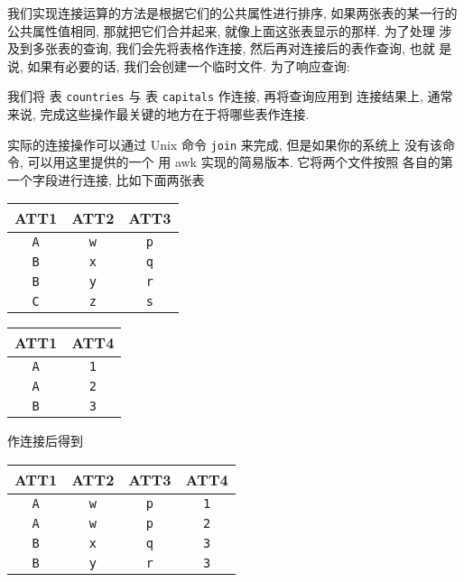 我们实现连接运算的方法是根据它们的公共属性进行排序, 如果两张表的某一行的
公共属性值相同, 那就把它们合并起来, 就像上面这张表显示的那样. 为了处理
涉及到多张表的查询, 我们会先将表格作连接, 然后再对连接后的表作查询, 也就 
是说, 如果有必要的话, 我们会创建一个临时文件.
为了响应查询:
我们将 表 \verb'countries' 与 表 \verb'capitals'  作连接, 再将查询应用到
连接结果上, 通常来说, 完成这些操作最关键的地方在于将哪些表作连接.

实际的连接操作可以通过 Unix 命令 \texttt{join} 来完成, 但是如果你的系统上
没有该命令, 可以用这里提供的一个 用 awk 实现的简易版本. 它将两个文件按照
各自的第一个字段进行连接, 比如下面两张表

\begin{center}
\begin{tabular}{c|c|c}
    \hline
    \hline
    ATT1    & ATT2 & ATT3 \\
    \hline
    \texttt{A}       & \texttt{w}    & \texttt{p}    \\
    \texttt{B}       & \texttt{x}    & \texttt{q}   \\
    \texttt{B}      & \texttt{y}    & \texttt{r}    \\
    \texttt{C}      & \texttt{z}    & \texttt{s}    \\
    \hline
\end{tabular}
\hspace{2em}
\begin{tabular}{c|c}
    \hline
    \hline
    ATT1    & ATT4 \\
    \hline
    \texttt{A}       & \texttt{1}   \\  
    \texttt{A}       & \texttt{2}   \\
    \texttt{B}      & \texttt{3}    \\
    \hline
\end{tabular}
\end{center}

\vspace{1em}
作连接后得到
\vspace{1em}

\begin{center}
\begin{tabular}{c|c|c|c}
    \hline
    \hline
    ATT1        & ATT2  & ATT3   &   ATT4   \\
    \hline
    \texttt{A}  & \texttt{w}    & \texttt{p} &  \texttt{1}  \\
    \texttt{A}  & \texttt{w}    & \texttt{p} &  \texttt{2}  \\
    \texttt{B}  & \texttt{x}    & \texttt{q} &  \texttt{3}  \\
    \texttt{B}  & \texttt{y}    & \texttt{r} &  \texttt{3}  \\
\end{tabular}
\end{center}
\vspace{1em}


